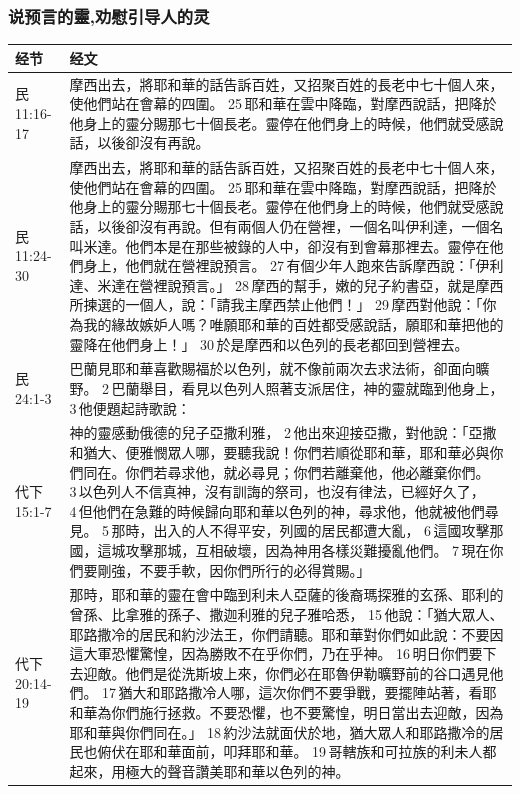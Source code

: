 \subsubsection{说预言的靈,劝慰引导人的灵}
\begin{table}[H]
\centering
\begin{tabular}{p{5em}p{43em}}  \toprule
经节&经文 \\  \midrule
民11:16-17&摩西出去，將耶和華的話告訴百姓，又招聚百姓的長老中七十個人來，使他們站在會幕的四圍。 25 耶和華在雲中降臨，對摩西說話，把降於他身上的靈分賜那七十個長老。靈停在他們身上的時候，他們就受感說話，以後卻沒有再說。\\  \midrule

民11:24-30&摩西出去，將耶和華的話告訴百姓，又招聚百姓的長老中七十個人來，使他們站在會幕的四圍。 25 耶和華在雲中降臨，對摩西說話，把降於他身上的靈分賜那七十個長老。靈停在他們身上的時候，他們就受感說話，以後卻沒有再說。但有兩個人仍在營裡，一個名叫伊利達，一個名叫米達。他們本是在那些被錄的人中，卻沒有到會幕那裡去。靈停在他們身上，他們就在營裡說預言。 27 有個少年人跑來告訴摩西說：「伊利達、米達在營裡說預言。」 28 摩西的幫手，嫩的兒子約書亞，就是摩西所揀選的一個人，說：「請我主摩西禁止他們！」 29 摩西對他說：「你為我的緣故嫉妒人嗎？唯願耶和華的百姓都受感說話，願耶和華把他的靈降在他們身上！」 30 於是摩西和以色列的長老都回到營裡去。\\  \midrule

民24:1-3&巴蘭見耶和華喜歡賜福於以色列，就不像前兩次去求法術，卻面向曠野。 2 巴蘭舉目，看見以色列人照著支派居住，神的靈就臨到他身上， 3 他便題起詩歌說：\\  \midrule
代下15:1-7&神的靈感動俄德的兒子亞撒利雅， 2 他出來迎接亞撒，對他說：「亞撒和猶大、便雅憫眾人哪，要聽我說！你們若順從耶和華，耶和華必與你們同在。你們若尋求他，就必尋見；你們若離棄他，他必離棄你們。 3 以色列人不信真神，沒有訓誨的祭司，也沒有律法，已經好久了， 4 但他們在急難的時候歸向耶和華以色列的神，尋求他，他就被他們尋見。 5 那時，出入的人不得平安，列國的居民都遭大亂， 6 這國攻擊那國，這城攻擊那城，互相破壞，因為神用各樣災難擾亂他們。 7 現在你們要剛強，不要手軟，因你們所行的必得賞賜。」\\  \midrule

代下20:14-19&那時，耶和華的靈在會中臨到利未人亞薩的後裔瑪探雅的玄孫、耶利的曾孫、比拿雅的孫子、撒迦利雅的兒子雅哈悉， 15 他說：「猶大眾人、耶路撒冷的居民和約沙法王，你們請聽。耶和華對你們如此說：不要因這大軍恐懼驚惶，因為勝敗不在乎你們，乃在乎神。 16 明日你們要下去迎敵。他們是從洗斯坡上來，你們必在耶魯伊勒曠野前的谷口遇見他們。 17 猶大和耶路撒冷人哪，這次你們不要爭戰，要擺陣站著，看耶和華為你們施行拯救。不要恐懼，也不要驚惶，明日當出去迎敵，因為耶和華與你們同在。」 18 約沙法就面伏於地，猶大眾人和耶路撒冷的居民也俯伏在耶和華面前，叩拜耶和華。 19 哥轄族和可拉族的利未人都起來，用極大的聲音讚美耶和華以色列的神。\\  \midrule


\end{tabular}
\end{table}
